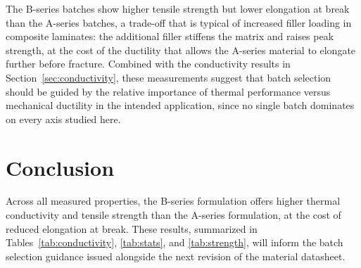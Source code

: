 \documentclass[11pt]{article}
\begin{document}
The B-series batches show higher tensile strength but lower elongation at
break than the A-series batches, a trade-off that is typical of increased
filler loading in composite laminates: the additional filler stiffens the
matrix and raises peak strength, at the cost of the ductility that allows
the A-series material to elongate further before fracture. Combined with
the conductivity results in Section~\ref{sec:conductivity}, these
measurements suggest that batch selection should be guided by the relative
importance of thermal performance versus mechanical ductility in the
intended application, since no single batch dominates on every axis
studied here.

\section{Conclusion}
Across all measured properties, the B-series formulation offers higher
thermal conductivity and tensile strength than the A-series formulation,
at the cost of reduced elongation at break. These results, summarized in
Tables~\ref{tab:conductivity}, \ref{tab:stats}, and \ref{tab:strength},
will inform the batch selection guidance issued alongside the next
revision of the material datasheet.
\end{document}
